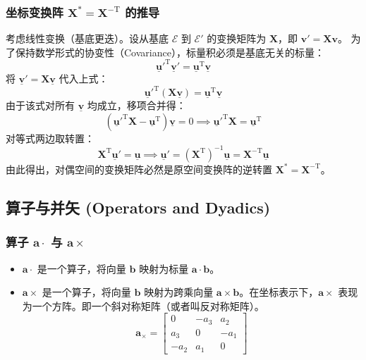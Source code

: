 \subsubsection{坐标变换阵 $\mathbf{X}^* = \mathbf{X}^{-\text{T}}$ 的推导}
考虑线性变换（基底更迭）。设从基底 $\mathcal{E}$ 到 $\mathcal{E}'$ 的变换矩阵为 $\mathbf{X}$，即 $\boldsymbol{v}' = \mathbf{X}\boldsymbol{v}$。
为了保持数学形式的协变性（Covariance），标量积必须是基底无关的标量：
\begin{equation}
\underline{\boldsymbol{u}}'^{\text{T}} \underline{\boldsymbol{v}}' = \underline{\boldsymbol{u}}^{\text{T}} \underline{\boldsymbol{v}}
\end{equation}
将 $\underline{\boldsymbol{v}}' = \mathbf{X}\underline{\boldsymbol{v}}$ 代入上式：
\begin{equation}
\underline{\boldsymbol{u}}'^{\text{T}} (\mathbf{X} \underline{\boldsymbol{v}}) = \underline{\boldsymbol{u}}^{\text{T}} \underline{\boldsymbol{v}}
\end{equation}
由于该式对所有 $\underline{\boldsymbol{v}}$ 均成立，移项合并得：
\begin{equation}
(\underline{\boldsymbol{u}}'^{\text{T}} \mathbf{X} - \underline{\boldsymbol{u}}^{\text{T}}) \underline{\boldsymbol{v}} = 0 \implies \underline{\boldsymbol{u}}'^{\text{T}} \mathbf{X} = \underline{\boldsymbol{u}}^{\text{T}}
\end{equation}
对等式两边取转置：
\begin{equation}
\mathbf{X}^{\text{T}} \underline{\boldsymbol{u}}' = \underline{\boldsymbol{u}} \implies \underline{\boldsymbol{u}}' = (\mathbf{X}^{\text{T}})^{-1} \underline{\boldsymbol{u}} = \mathbf{X}^{-\text{T}} \underline{\boldsymbol{u}}
\end{equation}
由此得出，对偶空间的变换矩阵必然是原空间变换阵的逆转置 $\mathbf{X}^* = \mathbf{X}^{-\text{T}}$。


\subsection{算子与并矢 (Operators and Dyadics)}

\subsubsection{算子 $\boldsymbol{a}\cdot$ 与 $\boldsymbol{a}\times$}
\begin{itemize}
    \item $\boldsymbol{a}\cdot$ 是一个算子，将向量 $\boldsymbol{b}$ 映射为标量 $\boldsymbol{a} \cdot \boldsymbol{b}$。
        \item $\boldsymbol{a}\times$ 是一个算子，将向量 $\boldsymbol{b}$ 映射为跨乘向量 $\boldsymbol{a} \times \boldsymbol{b}$。在坐标表示下，$\boldsymbol{a}\times$ 表现为一个方阵。即一个斜对称矩阵（或者叫反对称矩阵）。
        \begin{equation}
            \boldsymbol{a}_{\times} = \begin{bmatrix} 0 & -a_3 & a_2 \\ a_3 & 0 & -a_1 \\ -a_2 & a_1 & 0 \end{bmatrix}
        \end{equation}
\end{itemize}

